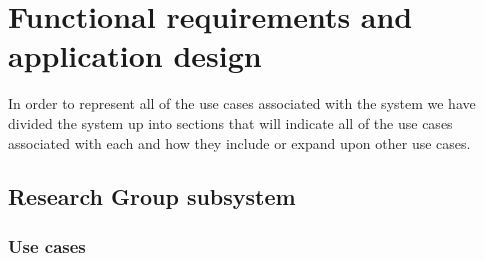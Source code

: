 \documentclass{article}
\begin{document}
\section{Functional requirements and application design}
In order to represent all of the use cases associated with the system we have divided the system up into sections that will indicate all of the use cases associated with each and how they include or expand upon other use cases.
	

\subsection{Research Group subsystem}
	\subsubsection{Use cases}
\end{document}
